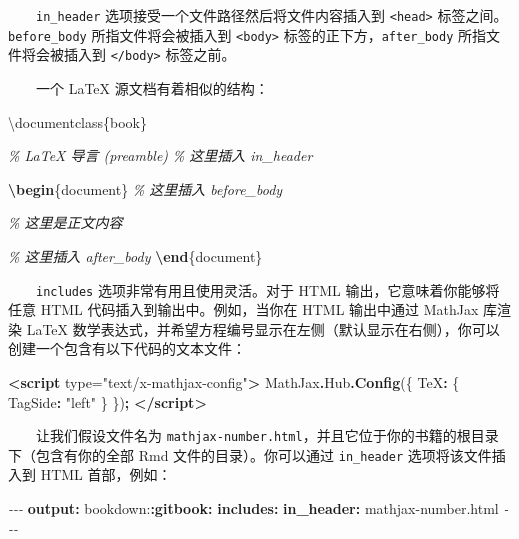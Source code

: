 \documentclass[
  12pt,
]{krantz}
\newenvironment{Shaded}{\begin{snugshade}}{\end{snugshade}}
\newcommand{\AttributeTok}[1]{\textcolor[rgb]{0.13,0.29,0.53}{#1}}
\newcommand{\BuiltInTok}[1]{#1}
\newcommand{\CommentTok}[1]{\textcolor[rgb]{0.56,0.35,0.01}{\textit{#1}}}
\newcommand{\DataTypeTok}[1]{\textcolor[rgb]{0.13,0.29,0.53}{#1}}
\newcommand{\ExtensionTok}[1]{#1}
\newcommand{\FunctionTok}[1]{\textcolor[rgb]{0.13,0.29,0.53}{\textbf{#1}}}
\newcommand{\KeywordTok}[1]{\textcolor[rgb]{0.13,0.29,0.53}{\textbf{#1}}}
\newcommand{\NormalTok}[1]{#1}
\newcommand{\OperatorTok}[1]{\textcolor[rgb]{0.81,0.36,0.00}{\textbf{#1}}}
\newcommand{\OtherTok}[1]{\textcolor[rgb]{0.56,0.35,0.01}{#1}}
\newcommand{\PreprocessorTok}[1]{\textcolor[rgb]{0.56,0.35,0.01}{\textit{#1}}}
\newcommand{\StringTok}[1]{\textcolor[rgb]{0.31,0.60,0.02}{#1}}
\theoremstyle{definition}
\theoremstyle{definition}
\theoremstyle{definition}
\theoremstyle{definition}
\theoremstyle{remark}
\begin{document}
  \texttt{in\_header} 选项接受一个文件路径然后将文件内容插入到 \texttt{\textless{}head\textgreater{}} 标签之间。\texttt{before\_body} 所指文件将会被插入到 \texttt{\textless{}body\textgreater{}} 标签的正下方，\texttt{after\_body} 所指文件将会被插入到 \texttt{\textless{}/body\textgreater{}} 标签之前。

  一个 LaTeX 源文档有着相似的结构：

\begin{Shaded}
\begin{Highlighting}[]
\BuiltInTok{\textbackslash{}documentclass}\NormalTok{\{}\ExtensionTok{book}\NormalTok{\}}

\CommentTok{\% LaTeX 导言 (preamble)}
\CommentTok{\% 这里插入 in\_header}

\KeywordTok{\textbackslash{}begin}\NormalTok{\{}\ExtensionTok{document}\NormalTok{\}}
\CommentTok{\% 这里插入 before\_body}

\CommentTok{\% 这里是正文内容}

\CommentTok{\% 这里插入 after\_body}
\KeywordTok{\textbackslash{}end}\NormalTok{\{}\ExtensionTok{document}\NormalTok{\}}
\end{Highlighting}
\end{Shaded}

  \texttt{includes} 选项非常有用且使用灵活。对于 HTML 输出，它意味着你能够将任意 HTML 代码插入到输出中。例如，当你在 HTML 输出中通过 MathJax 库渲染 LaTeX 数学表达式，并希望方程编号显示在左侧（默认显示在右侧），你可以创建一个包含有以下代码的文本文件：

\begin{Shaded}
\begin{Highlighting}[]
\KeywordTok{\textless{}script}\OtherTok{ type=}\StringTok{"text/x{-}mathjax{-}config"}\KeywordTok{\textgreater{}}
\NormalTok{MathJax}\OperatorTok{.}\AttributeTok{Hub}\OperatorTok{.}\FunctionTok{Config}\NormalTok{(\{}
  \DataTypeTok{TeX}\OperatorTok{:}\NormalTok{ \{ }\DataTypeTok{TagSide}\OperatorTok{:} \StringTok{"left"}\NormalTok{ \}}
\NormalTok{\})}\OperatorTok{;}
\KeywordTok{\textless{}/script\textgreater{}}
\end{Highlighting}
\end{Shaded}

  让我们假设文件名为 \texttt{mathjax-number.html}，并且它位于你的书籍的根目录下（包含有你的全部 Rmd 文件的目录）。你可以通过 \texttt{in\_header} 选项将该文件插入到 HTML 首部，例如：

\begin{Shaded}
\begin{Highlighting}[]
\PreprocessorTok{{-}{-}{-}}
\FunctionTok{output}\KeywordTok{:}
\AttributeTok{  bookdown:}\FunctionTok{:gitbook}\KeywordTok{:}
\AttributeTok{    }\FunctionTok{includes}\KeywordTok{:}
\AttributeTok{      }\FunctionTok{in\_header}\KeywordTok{:}\AttributeTok{ mathjax{-}number.html}
\PreprocessorTok{{-}{-}{-}}
\end{Highlighting}
\end{Shaded}
\end{document}
